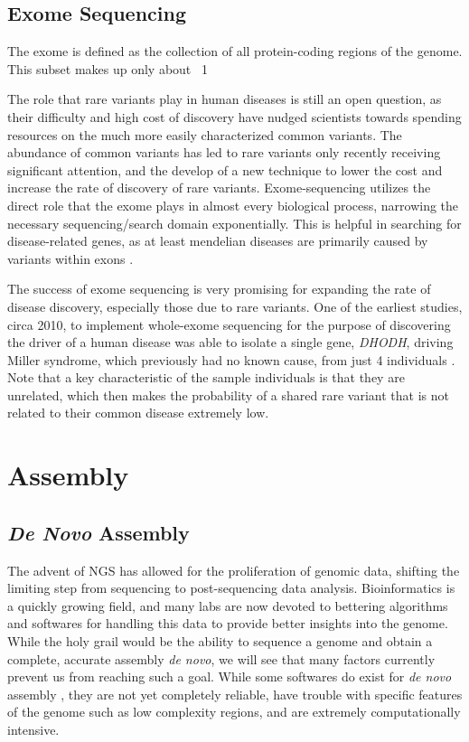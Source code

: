 \documentclass{easychithesis}
\begin{document}
\subsection{Exome Sequencing}
The exome is defined as the collection of all protein-coding regions of the genome. This subset makes up only about ~1%

The role that rare variants play in human diseases is still an open question, as their difficulty and high cost of discovery have nudged scientists towards spending resources on the much more easily characterized common variants. The abundance of common variants has led to rare variants only recently receiving significant attention, and the develop of a new technique to lower the cost and increase the rate of discovery of rare variants. Exome-sequencing utilizes the direct role that the exome plays in almost every biological process, narrowing the necessary sequencing/search domain exponentially. This is helpful in searching for disease-related genes, as at least mendelian diseases are primarily caused by variants within exons \cite{stenson2003human, ng2009targeted}.

The success of exome sequencing is very promising for expanding the rate of disease discovery, especially those due to rare variants. One of the earliest studies, circa 2010, to implement whole-exome sequencing for the purpose of discovering the driver of a human disease was able to isolate a single gene, \textit{DHODH}, driving Miller syndrome, which previously had no known cause, from just 4 individuals \cite{ng2010exome}. Note that a key characteristic of the sample individuals is that they are unrelated, which then makes the probability of a shared rare variant that is not related to their common disease extremely low. 

\section{Assembly}
\subsection{\textit{De Novo} Assembly}
The advent of NGS has allowed for the proliferation of genomic data, shifting the limiting step from sequencing to post-sequencing data analysis. Bioinformatics is a quickly growing field, and many labs are now devoted to bettering algorithms and softwares for handling this data to provide better insights into the genome. While the holy grail would be the ability to sequence a genome and obtain a complete, accurate assembly \textit{de novo}, we will see that many factors currently prevent us from reaching such a goal. While some softwares do exist for \textit{de novo} assembly \cite{simpson2009abyss, zerbino2008velvet, chu2013assembler}, they are not yet completely reliable, have trouble with specific features of the genome such as low complexity regions, and are extremely computationally intensive.
\end{document}
